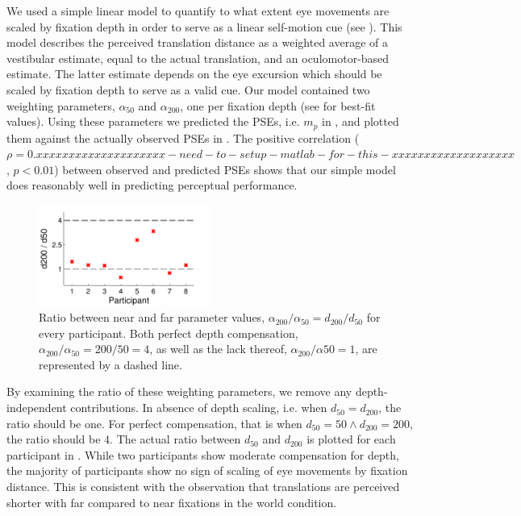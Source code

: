 We used a simple linear model to quantify to what extent eye movements are scaled by fixation depth in order to serve as a linear self-motion cue (see ). This model describes the perceived translation distance as a weighted average of a vestibular estimate, equal to the actual translation, and an oculomotor-based estimate. The latter estimate depends on the eye excursion which should be scaled by fixation depth to serve as a valid cue. Our model contained two weighting parameters, $\alpha_{50}$ and $\alpha_{200}$, one per fixation depth (see  for best-fit values). Using these parameters we predicted the PSEs, i.e. $m_p$ in , and plotted them against the actually observed PSEs in . The positive correlation ($\rho = 0.xxxxxxxxxxxxxxxxxxxx-need-to-setup-matlab-for-this-xxxxxxxxxxxxxxxxxxx$, $p < 0.01$) between observed and predicted PSEs shows that our simple model does reasonably well in predicting perceptual performance.

\begin{figure}
    \includegraphics[width=0.5\textwidth]{src/paper4/p4_figure5.pdf}

	\caption{Ratio between near and far parameter values, $\alpha_{200} / \alpha_{50} = d_{200} / d_{50}$ for every participant. Both perfect depth compensation, $\alpha_{200} / \alpha_{50} = 200 / 50 = 4$, as well as the lack thereof, $\alpha_{200} / \alpha{50} = 1$, are represented by a dashed line.}
	\label{p4:fig5}
\end{figure}

By examining the ratio of these weighting parameters, we remove any depth-independent contributions. In absence of  depth scaling, i.e. when $d_{50} = d_{200}$, the ratio should be one. For perfect compensation, that is when $d_{50} = 50  \wedge d_{200} = 200$, the ratio should be $4$. The actual ratio between $d_{50}$ and $d_{200}$ is plotted for each participant in . While two participants show moderate compensation for depth, the majority of participants show no sign of scaling of eye movements by fixation distance. This is consistent with the observation that translations are perceived shorter with far compared to near fixations in the world condition.


